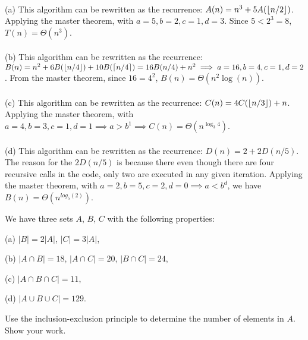 \documentclass[11pt]{article}
\begin{document}
\begin{solution}
   \\
	(a) This algorithm can be rewritten as the recurrence: $A(n) = n^3 + 5A({\left\lfloor n/2\right\rfloor})$. Applying the master theorem, with $a = 5, b=2, c=1, d=3$. Since $5 < 2^3=8$, $T(n) = \Theta(n^3)$.
   \\\\
   (b) This algorithm can be rewritten as the recurrence: $B(n) = n^2 + 6B({\left\lfloor n/4\right\rfloor}) + 10B(\lceil{n/4}\rceil) = 16B(n/4) + n^2 \implies a=16, b=4, c=1, d=2$. From the master theorem, since $16=4^2$, $B(n) = \Theta(n^2\log(n))$.
   \\\\
   (c) This algorithm can be rewritten as the recurrence: $C(n) = 4C({\left\lfloor n/3\right\rfloor}) + n$. Applying the master theorem, with $a=4, b=3, c=1, d=1 \implies a > b^1 \implies C(n) = \Theta(n^{\log_3{4}})$.
   \\\\
   (d) This algorithm can be rewritten as the recurrence: $D(n) = 2 + 2D(n/5)$. The reason for the $2D(n/5)$ is because there even though there are four recursive calls in the code, only two are executed in any given iteration. Applying the master theorem, with $a=2,b=5,c=2,d=0 \implies a < b^d$, we have $B(n) = \Theta(n^{log_5(2)})$.
\end{solution}


\newpage
\vspace{0.1in}
\begin{problem}
We have three sets $A$, $B$, $C$ with the following properties:

\begin{description}

\item{(a)}  $|B| = 2|A|$, $|C| = 3|A|$, 


\item{(b)} $|A\cap B| = 18$,
        $|A\cap C| = 20$,
        $|B\cap C| = 24$,

\item{(c)}
$|A\cap B\cap C| = 11$,

\item{(d)}
$|A\cup B\cup C| = 129$.

\end{description}

\noindent Use the inclusion-exclusion principle to determine the number of elements in $A$. 
Show your work.
\end{problem}
\end{document}
